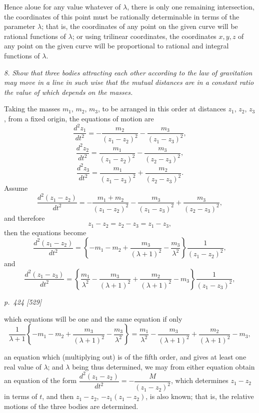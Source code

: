\documentclass[11pt,a4paper]{book}
\begin{document}
Hence aloue for any value whatever of $\lambda$, there is only one remaining intersection, the coordinates of this point must be rationally determinable in terms of the parameter $\lambda$; that is, the coordinates of any point on the given curve will be rational functions of $\lambda$; or using trilinear coordinates, the coordinates $x, y, z$ of any point on the given curve will be proportional to rational and integral functions of $\lambda$.

\textit{8. Show that three bodies attracting each other according to the law of gravitation may move in a line in such wise that the mutual distances are in a constant ratio the value of which depends on the masses.}

Taking the masses $m_1$, $m_2$, $m_3$, to be arranged in this order at distances $z_1$, $z_2$, $z_3$,
from a fixed origin, the equations of motion are
\[
\frac{d^2 z_1}{dt^2} = -\frac{m_2}{(z_1 - z_2)^2} - \frac{m_3}{(z_1 - z_3)^2},
\]
\[
\frac{d^2 z_2}{dt^2} = \frac{m_1}{(z_1 - z_2)^2} - \frac{m_3}{(z_2 - z_3)^2},
\]
\[
\frac{d^2 z_3}{dt^2} = \frac{m_1}{(z_1 - z_3)^2} + \frac{m_2}{(z_2 - z_3)^2}.
\]
Assume
\[
\frac{d^2(z_1 - z_2)}{dt^2} = -\frac{m_1 + m_2}{(z_1 - z_2)^2} - \frac{m_3}{(z_1 - z_3)^2} + \frac{m_3}{(z_2 - z_3)^2},
\]
and therefore
\[
z_1 - z_2 = z_2 - z_3 = z_1 - z_3,
\]
then the equations become
\[
\frac{d^2(z_1 - z_2)}{dt^2} = \left\{- m_1 - m_2 + \frac{m_3}{(\lambda + 1)^2} - \frac{m_3}{\lambda^2}\right\}\frac{1}{(z_1 - z_2)^2},
\]
and
\[
\frac{d^2(z_1 - z_3)}{dt^2} = \left\{\frac{m_1}{\lambda^2} - \frac{m_3}{(\lambda + 1)^2} + \frac{m_2}{(\lambda + 1)^2} - m_3\right\}\frac{1}{(z_1 - z_3)^2},
\]

\clearpage

\bigskip
\textit{p.~424 [529]}
\smallskip

which equations will be one and the same equation if only
\[
\frac{1}{\lambda + 1}\left\{- m_1 - m_2 + \frac{m_3}{(\lambda + 1)^2} - \frac{m_3}{\lambda^2}\right\} = \frac{m_1}{\lambda^2} - \frac{m_3}{(\lambda + 1)^2} + \frac{m_2}{(\lambda + 1)^2} - m_3 ,
\]

\noindent
an equation which (multiplying out) is of the fifth order, and gives at least one real
value of $\lambda$; and $\lambda$ being thus determined, we may from either equation obtain an
equation of the form $\dfrac{d^2(z_1 - z_2)}{dt^2} = -\dfrac{M}{(z_1 - z_2)^2}$, which determines $z_1 - z_2$ in terms of $t$, and
then $z_1 - z_2$, $-z_1 (z_1 - z_2)$, is also known; that is, the relative motions of the three bodies
are determined.
\end{document}
